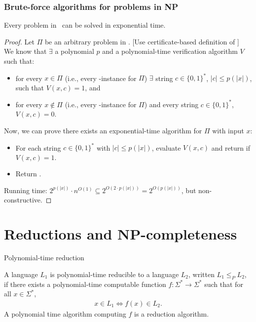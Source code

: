 \begin{frame}
	\frametitle{Brute-force algorithms for problems in NP}

	\begin{theorem}
		Every problem in \NP\ can be solved in exponential time.
	\end{theorem}
	\pause
	\begin{proof}
		Let $\Pi$ be an arbitrary problem in \NP. [Use certificate-based definition of \NP]\\
		We know that $\exists$ a polynomial $p$ and a polynomial-time verification algorithm $V$ such that:
		\begin{itemize}
			\item for every $x\in \Pi$ (i.e., every \Yes-instance for $\Pi$) $\exists$ string $c \in \{0,1\}^*$, $|c| \le p(|x|)$, such that $V(x,c)=1$, and
			\item for every $x\notin \Pi$ (i.e., every \No-instance for $\Pi$) and every string $c \in \{0,1\}^*$, $V(x,c)=0$.
		\end{itemize}
		\pause
		Now, we can prove there exists an exponential-time algorithm for $\Pi$ with input $x$:
		\begin{itemize}
			\item For each string $c\in \{0,1\}^*$ with $|c|\le p(|x|)$, evaluate $V(x,c)$ and return \Yes if $V(x,c)=1$.
			\item Return \No.
		\end{itemize}
		Running time: $2^{p(|x|)} \cdot n^{O(1)} \subseteq 2^{O(2\cdot p(|x|))} = 2^{O(p(|x|))}$, but non-constructive.
	\end{proof}
\end{frame}

\section{Reductions and NP-completeness}

\begin{frame}{Polynomial-time reduction}
	\begin{definition}
		A language $L_1$ is \alert{polynomial-time reducible} to a language $L_2$, written $L_1 \leq_P L_2$,
		if there exists a polynomial-time computable function $f: \Sigma^* \rightarrow \Sigma^*$ such that for all $x\in \Sigma^*$,
		\begin{align*}
			x \in L_1 \Leftrightarrow f(x) \in L_2.
		\end{align*}
		A polynomial time algorithm computing $f$ is a \alert{reduction algorithm}.
	\end{definition}
\end{frame}


